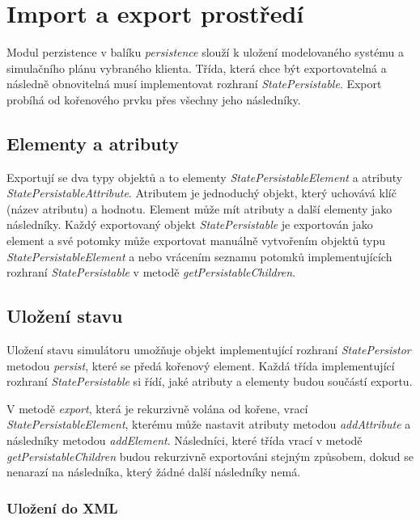 \documentclass[czech,DP]{thesiskiv}
\begin{document}
\section{Import a export prostředí}

Modul perzistence v balíku \textit{persistence} slouží k uložení modelovaného systému a simulačního plánu vybraného klienta. Třída, která chce být exportovatelná a následně obnovitelná musí implementovat rozhraní \textit{StatePersistable}. Export probíhá od kořenového prvku přes všechny jeho následníky.

\subsection{Elementy a atributy}

Exportují se dva typy objektů a to elementy \textit{StatePersistableElement} a atributy \textit{StatePersistableAttribute}. Atributem je jednoduchý objekt, který uchovává klíč (název atributu) a hodnotu. Element může mít atributy a další elementy jako následníky. Každý exportovaný objekt \textit{StatePersistable} je exportován jako element a své potomky může exportovat manuálně vytvořením objektů typu \textit{StatePersistableElement} a nebo vrácením seznamu potomků implementujících rozhraní \textit{StatePersistable} v metodě \textit{getPersistableChildren}. 

\subsection{Uložení stavu}

Uložení stavu simulátoru umožňuje objekt implementující rozhraní \textit{StatePersistor} metodou \textit{persist}, které se předá kořenový element. Každá třída implementující rozhraní \textit{StatePersistable} si řídí, jaké atributy a elementy budou součástí exportu. 

V metodě \textit{export}, která je rekurzivně volána od kořene, vrací \textit{StatePersistableElement}, kterému může nastavit atributy metodou \textit{addAttribute} a následníky metodou \textit{addElement}. Následníci, které třída vrací v metodě  \textit{getPersistableChildren} budou rekurzivně exportováni stejným způsobem, dokud se nenarazí na následníka, který žádné další následníky nemá.

\subsubsection*{Uložení do XML}
\end{document}
